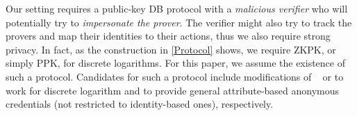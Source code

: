 Our setting requires a public-key \ac{DB} protocol with a \emph{malicious verifier} who will potentially try to \emph{impersonate the prover}.
The verifier might also try to track the provers and map their identities to 
their actions, thus we also require strong privacy.
In fact, as the construction in \cref{Protocol} shows, we require  
\ac{ZKPK}, or simply \ac{PPK}, for discrete logarithms.
For this paper, we assume the existence of such a protocol. Candidates for such a protocol include modifications of ~\cite{ProProx} or \cite{PROPS} to work for discrete logarithm and to provide general attribute-based anonymous credentials (not restricted to identity-based ones), respectively.

